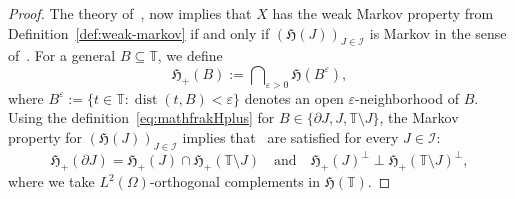 \documentclass[reqno]{amsart}
\numberwithin{equation}{section}
\newcommand{\bbT}{\mathbb{T}}
\theoremstyle{remark}
\theoremstyle{definition}
\begin{document}
\begin{proof}
	The theory of~\cite[Chapter~2, Section~3.1]{Rozanov1982}, 
	now implies that $X$ has the weak Markov property from Definition~\ref{def:weak-markov} if and only
	if $(\mathfrak H(J))_{J \in \mathscr I}$ is Markov in the sense of~\cite[p.~97]{Rozanov1982}.
	For a general $B \subseteq \bbT$, we define
	\begin{equation}\label{eq:mathfrakHplus}
		\mathfrak H_+(B) := \bigcap\nolimits_{\varepsilon>0} \mathfrak H(B^\varepsilon),
	\end{equation}
	where 
	$B^\varepsilon := \{t \in \bbT : \operatorname{dist}(t, B) < \varepsilon \}$ 
	denotes an open $\varepsilon$-neighborhood of $B$.
	Using the definition~\eqref{eq:mathfrakHplus} for $B \in \{\partial J, J, \bbT\setminus J\}$,
	the Markov property for $(\mathfrak H(J))_{J \in \mathscr I}$ 
	implies that~\cite[Equations~(3.14), p.~97]{Rozanov1982}
	are satisfied for every $J \in \mathscr I$:
	\begin{equation}
		\mathfrak H_+(\partial J) = \mathfrak H_+(J) \cap \mathfrak H_+(\bbT \setminus J)
		\quad \text{and} \quad 
		\mathfrak H_+(J)^\perp \perp \mathfrak H_+(\bbT \setminus J)^\perp, \label{eq:condition-2-weak-Markov-GRF}
	\end{equation}
	where we take $L^2(\Omega)$-orthogonal complements in $\mathfrak H(\bbT)$.
	

\end{proof}
\end{document}
